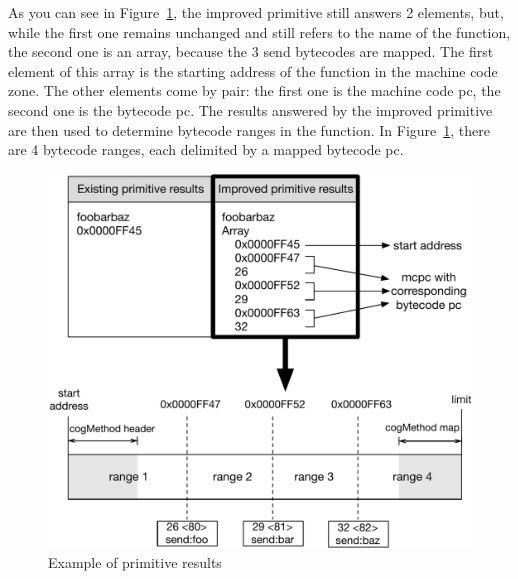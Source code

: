 \documentclass[10pt,preprint,nonatbib]{sigplanconf}
\newcommand{\figref}[1]{Figure~\ref{fig:#1}}
\begin{document}
As you can see in \figref{BytecodeRange}, the improved primitive still answers 2 elements, but, while the first one remains unchanged and still refers to the name of the function, the second one is an array, because the 3 send bytecodes are mapped. The first element of this array is the starting address of the function in the machine code zone. The other elements come by pair: the first one is the machine code pc, the second one is the bytecode pc.
The results answered by the improved primitive are then used to determine bytecode ranges in the function. In \figref{BytecodeRange}, there are 4 bytecode ranges, each delimited by a mapped bytecode pc.  


 \begin{figure}[htp!]
     \begin{center}
         \includegraphics[width=1.0\linewidth]{BytecodeRange}
         \caption{Example of primitive results}
         \label{fig:BytecodeRange}
     \end{center}
 \end{figure}
\end{document}
